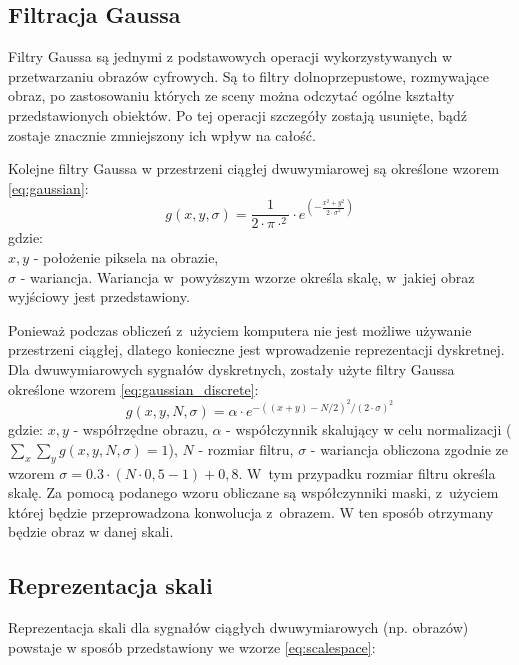 \subsection{Filtracja Gaussa}
\label{subsec:filtracjaGaussa}
Filtry Gaussa są jednymi z podstawowych operacji wykorzystywanych w przetwarzaniu obrazów cyfrowych. Są to filtry dolnoprzepustowe, rozmywające obraz, po zastosowaniu których ze sceny można odczytać ogólne kształty przedstawionych obiektów. Po tej operacji szczegóły zostają usunięte, bądź zostaje znacznie zmniejszony ich wpływ na całość.

Kolejne filtry Gaussa w przestrzeni ciągłej dwuwymiarowej są określone wzorem \ref{eq:gaussian}:
\begin{equation}
\label{eq:gaussian}
g(x,y,\sigma)=\frac{1}{2 \cdot \pi \cdot ^ {2} }\cdot e^{(-\frac{x^{2} + y^{2}}{2 \cdot \sigma ^{2}})}
\end{equation}
gdzie:\\
$ x,y $ - położenie piksela na obrazie, \\
$ \sigma $ - wariancja.
\newline
Wariancja w~powyższym wzorze określa skalę, w~jakiej obraz wyjściowy jest przedstawiony. 

Ponieważ podczas obliczeń z~użyciem komputera nie jest możliwe używanie przestrzeni ciągłej, dlatego konieczne jest wprowadzenie reprezentacji dyskretnej. 
Dla dwuwymiarowych sygnałów dyskretnych, zostały użyte filtry Gaussa określone wzorem \ref{eq:gaussian_discrete}:
\begin{equation}
\label{eq:gaussian_discrete}
g(x,y,N,\sigma) = \alpha \cdot e^{-((x+y)-N/2)^2/(2 \cdot \sigma)^2}
\end{equation}
gdzie: \newline 
$ x, y$ - współrzędne obrazu, \newline
$ \alpha $ - współczynnik skalujący w celu normalizacji ($ \sum_x \sum_y g(x,y,N,\sigma) = 1 $), \newline
$ N $ - rozmiar filtru, \newline
$ \sigma $ - wariancja obliczona zgodnie ze wzorem $ \sigma = 0.3 \cdot (N \cdot 0,5 - 1) + 0,8$. \newline
W~tym przypadku rozmiar filtru określa skalę. Za pomocą podanego wzoru obliczane są współczynniki maski, z~użyciem której będzie przeprowadzona konwolucja z~obrazem. W ten sposób otrzymany będzie obraz w danej skali.

\subsection{Reprezentacja skali}
\label{subsec:reprezentacjaskali}
Reprezentacja skali dla sygnałów ciągłych dwuwymiarowych (np. obrazów) powstaje w sposób przedstawiony we wzorze \ref{eq:scalespace}:


